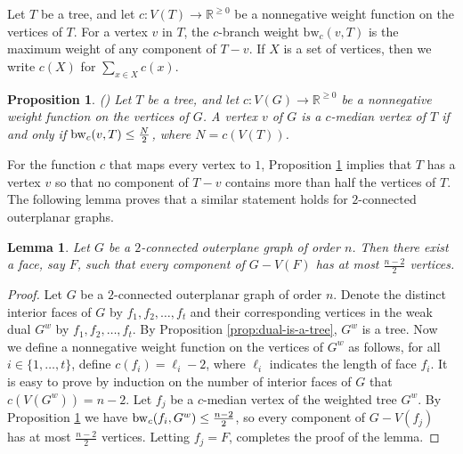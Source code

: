 \documentclass[a4paper,11pt]{article}
\newtheorem{proposition}[theorem]%
{Proposition}
\newtheorem{lemma}[theorem]%
{Lemma}
\numberwithin{equation}{theorem}
\begin{document}
Let \( T \) be a tree, and let \( c: V(T) \to \mathbb{R}^{\geq 0} \) be a nonnegative weight function on the vertices of \( T \). 
For a vertex \( v \) in \( T \), the \( c \)-branch weight \( \text{bw}_c(v, T) \) is the maximum weight of any component of \( T - v \).  If $X$ is a set of vertices, then we write $c(X)$ for $\sum_{x\in X} c(x)$. 





\begin{proposition}{\rm (\cite{KarHak1979})} \label{prop:median-branchweight-weighted}  
Let $T$ be a tree, and let $c: V(G) \to \mathbb{R}^{\geq 0}$ be a nonnegative weight function on 
the vertices of $G$. A vertex $v$ of $G$ is a $c$-median vertex of $T$ if and only if 
${\rm bw}_c(v, T) \leq \frac{N}{2}$, where $N=c(V(T))$.
\end{proposition}


For the function $c$ that maps every vertex  to $1$, 
Proposition \ref{prop:median-branchweight-weighted} implies that $T$ has a vertex $v$ so that
no component of $T-v$ contains more than half the vertices of $T$. 
The following lemma proves that a similar statement holds for $2$-connected
outerplanar graphs. 


\begin{lemma}
\label{lemm:face-component-has-at-most-n-2/2 vertices}
Let $G$ be a $2$-connected outerplane graph of order $n$. Then there exist a face, say $F$, such that every component of $G - V(F)$ has at most $\frac{n-2}{2}$ vertices.
\end{lemma}

\begin{proof}
Let $G$ be a $2$-connected outerplanar graph of order $n$. Denote the distinct interior faces of $G$ by 
$f_1, f_2, \ldots, f_t$ and their corresponding vertices in the weak dual $G^w$ by 
$f_1, f_2, \ldots, f_t$. 
By Proposition \ref{prop:dual-is-a-tree}, $G^{w}$ is a tree. 
Now we define a nonnegative weight function on the vertices of $G^w$ as follows, 
for all $i\in\{1,\ldots,t\} $, define $c(f_i)=\ell_{i}-2$, where $\ell_{i}$ indicates the length of face 
$f_i$. It is easy to prove by induction on the number of interior faces of $G$ that $c(V(G^w))=n-2$. 
Let $f_j$ be a $c$-median vertex of 
the weighted tree $G^w$. By Proposition \ref{prop:median-branchweight-weighted} we have 
${\rm bw}_c(f_i,G^w) \leq \frac{n-2}{2}$, so every component of $G - V(f_j)$ has at most 
$\frac{n-2}{2}$ vertices. Letting $f_j=F$, completes the proof of the lemma.
\end{proof}
 
\end{document}
